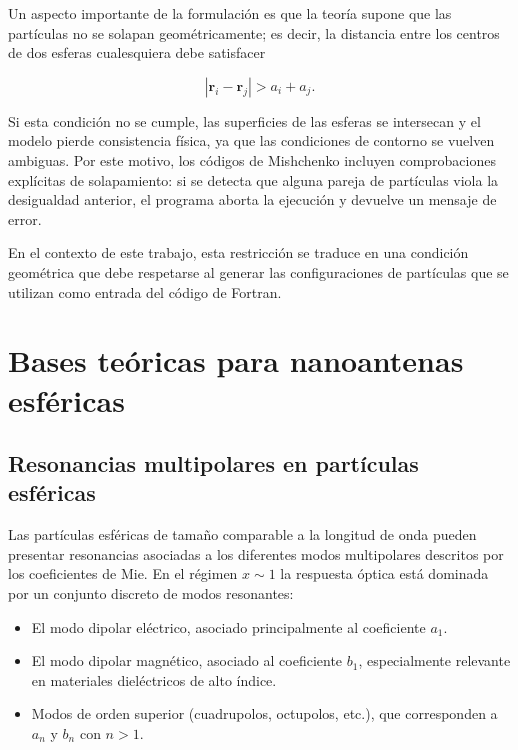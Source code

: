 \documentclass[12pt,a4paper]{article}
\begin{document}
Un aspecto importante de la formulación es que la teoría supone que las partículas no se solapan geométricamente; es decir, la distancia entre los centros de dos esferas cualesquiera
debe satisfacer

\begin{equation}
  |\mathbf{r}_i - \mathbf{r}_j| > a_i + a_j.
\end{equation}

Si esta condición no se cumple, las superficies de las esferas se intersecan y el modelo pierde consistencia física, ya que las condiciones de contorno se vuelven ambiguas.
Por este motivo, los códigos de Mishchenko incluyen comprobaciones explícitas de solapamiento: si se detecta que alguna pareja de partículas viola la desigualdad anterior,
el programa aborta la ejecución y devuelve un mensaje de error.

En el contexto de este trabajo, esta restricción se traduce en una condición geométrica que debe respetarse al generar las configuraciones de partículas que se utilizan como entrada
del código de Fortran.



\section{Bases teóricas para nanoantenas esféricas}

\subsection{Resonancias multipolares en partículas esféricas}

Las partículas esféricas de tamaño comparable a la longitud de onda pueden presentar resonancias asociadas a los diferentes modos multipolares descritos por los coeficientes de Mie.
En el régimen $x \sim 1$ la respuesta óptica está dominada por un conjunto discreto de modos resonantes:

\begin{itemize}
  \item El modo dipolar eléctrico, asociado principalmente al coeficiente $a_1$.
  \item El modo dipolar magnético, asociado al coeficiente $b_1$, especialmente relevante en materiales dieléctricos de alto índice.
  \item Modos de orden superior (cuadrupolos, octupolos, etc.), que corresponden a $a_n$ y $b_n$ con $n>1$.
\end{itemize}
\end{document}
